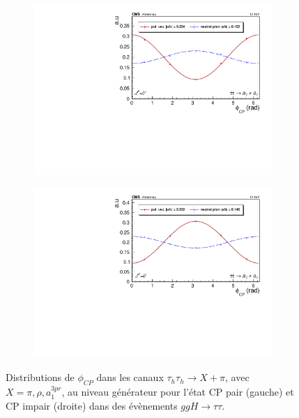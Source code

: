\begin{figure}[]
    \begin{subfigure}[b]{0.5\linewidth}
    \centering
    \includegraphics[width=\linewidth]{Chapitre6/Images/A1A1/A1A1_even_gen.pdf} 
    \caption*{} 
    \vspace{0.5ex}
  \end{subfigure}%
  \begin{subfigure}[b]{0.5\linewidth}
    \centering
    \includegraphics[width=\linewidth]{Chapitre6/Images/A1A1/A1A1_odd_gen.pdf} 
    \caption*{} 
    \vspace{0.5ex}
  \end{subfigure} 
  \caption{Distributions de $\phi_{CP}$ dans les canaux $\tau_h\tau_h\rightarrow X+\pi$, avec $X=\pi,\rho,a^{3pr}_1$, au niveau générateur pour l'état CP pair (gauche) et CP impair (droite) dans des évènements $ggH\to\tau\tau$.}
  \label{CPgen}
\end{figure}


